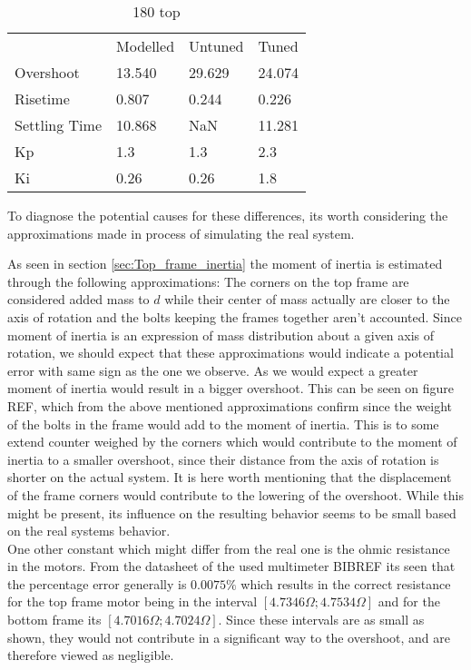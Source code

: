 \documentclass[../../main]{subfiles}
\begin{document}
\begin{table}[h]
	\centering
	\begin{tabular}{*{4}{l}}
		&Modelled&Untuned&Tuned\\
		Overshoot&13.540&29.629&24.074\\
		Risetime&0.807&0.244&0.226\\
		Settling Time&10.868&NaN&11.281\\
		Kp&1.3&1.3&2.3\\
		Ki&0.26&0.26&1.8
	\end{tabular}
	\caption{180 top}
	\label{tab:180_top}
\end{table}


To diagnose the potential causes for these differences, its worth considering the approximations made in process of simulating the real system.


As seen in section \ref{sec:Top_frame_inertia} the moment of inertia is estimated through the following approximations: The corners on the top frame are considered added mass to $d$ while their center of mass actually are closer to the axis of rotation and the bolts keeping the frames together aren't accounted. Since moment of inertia is an expression of mass distribution about a given axis of rotation, we should expect that these approximations would indicate a potential error with same sign as the one we observe. As we would expect a greater moment of inertia would result in a bigger overshoot. This can be seen on figure REF, which from the above mentioned approximations confirm since the weight of the bolts in the frame would add to the moment of inertia. This is to some extend counter weighed by the corners which would contribute to the moment of inertia to a smaller overshoot, since their distance from the axis of rotation is shorter on the actual system. It is here worth mentioning that the displacement of the frame corners would contribute to the lowering of the overshoot. While this might be present, its influence on the resulting behavior seems to be small based on the real systems behavior.\\
One other constant which might differ from the real one is the ohmic resistance in the motors. From the datasheet of the used multimeter BIBREF its seen that the percentage error generally is $0.0075\%$ which results in the correct resistance for the top frame motor being in the interval $[4.7346\Omega;4.7534\Omega]$ and for the bottom frame its $[4.7016\Omega;4.7024\Omega]$. Since these intervals are as small as shown, they would not contribute in a significant way to the overshoot, and are therefore viewed as negligible.\\
\end{document}
